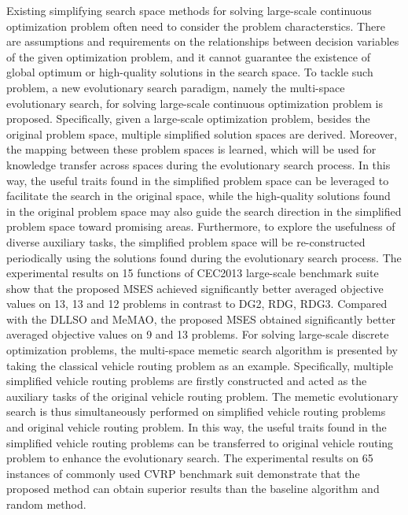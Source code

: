 \begin{eabstract}
 Existing simplifying search space methods for solving large-scale continuous optimization problem often need to consider the problem characterstics. There are assumptions and requirements on the relationships between decision variables of the given optimization problem, and it cannot guarantee the existence of global optimum or high-quality solutions in the search space. To tackle such problem, a new evolutionary search paradigm, namely the multi-space evolutionary search, for solving large-scale continuous optimization problem is proposed. Specifically, given a large-scale optimization problem, besides the original problem space, multiple simplified solution spaces are derived. Moreover, the mapping between these problem spaces is learned, which will be used for knowledge transfer across spaces during the evolutionary search process. In this way, the useful traits found in the simplified problem space can be leveraged to facilitate the search in the original space, while the high-quality solutions found in the original problem space may also guide the search direction in the simplified problem space toward promising areas. Furthermore, to explore the usefulness of diverse auxiliary tasks, the simplified problem space will be re-constructed periodically using the solutions found during the evolutionary search process. The experimental results on 15 functions of CEC2013 large-scale benchmark suite show that the proposed MSES achieved significantly better averaged objective values on 13, 13 and 12 problems in contrast to DG2, RDG, RDG3. Compared with the DLLSO and MeMAO, the proposed MSES obtained significantly better averaged objective values on 9 and 13 problems.
 For solving large-scale discrete optimization problems, the multi-space memetic search algorithm is presented by taking the classical vehicle routing problem as an example. Specifically, multiple simplified vehicle routing problems are firstly constructed and acted as the auxiliary tasks of the original vehicle routing problem. The memetic evolutionary search is thus simultaneously performed on simplified vehicle routing problems and original vehicle routing problem. In this way, the useful traits found in the simplified vehicle routing problems can be transferred to original vehicle routing problem to enhance the evolutionary search. The experimental results on 65 instances of commonly used CVRP benchmark suit demonstrate that the proposed method can obtain superior results than the baseline algorithm and random method.

\end{eabstract}
